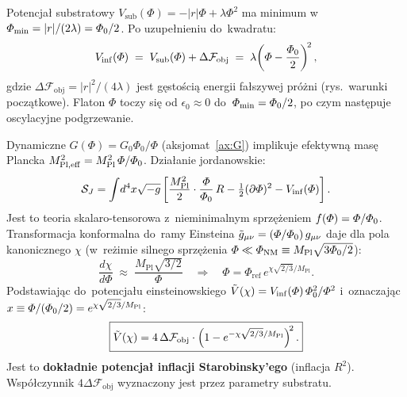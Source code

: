 Potencja\l{} substratowy $V_\mathrm{sub}(\Phi) = -|r|\Phi + \lambda\Phi^2$
ma minimum w~$\varPhi_\mathrm{min} = |r|/(2\lambda) = \varPhi_0/2$.
Po uzupe\l{}nieniu do~kwadratu:
\begin{equation}\label{eq:Vinf-quadratic}
    V_\mathrm{inf}(\varPhi)
    \;=\; V_\mathrm{sub}(\varPhi) + \Delta\mathcal{F}_\mathrm{obj}
    \;=\; \lambda\!\left(\varPhi - \frac{\varPhi_0}{2}\right)^{\!2},
\end{equation}
gdzie $\Delta\mathcal{F}_\mathrm{obj} = |r|^2/(4\lambda)$ jest g\k{e}sto\'sci\k{a}
energii fa\l{}szywej pr\'o\.zni (rys.~warunki pocz\k{a}tkowe).
Flaton $\Phi$ toczy si\k{e} od $\epsilon_0 \approx 0$ do~$\varPhi_\mathrm{min} = \varPhi_0/2$,
po czym nast\k{e}puje oscylacyjne podgrzewanie.

Dynamiczne $G(\Phi) = G_0\Phi_0/\Phi$ (aksjomat~\ref{ax:G}) implikuje
efektywn\k{a} mas\k{e} Plancka $M_\mathrm{Pl,eff}^2 = M_\mathrm{Pl}^2\,\varPhi/\varPhi_0$.
Dzia\l{}anie jordanowskie:
\begin{equation}\label{eq:action-jordan}
    \mathcal{S}_J = \int\!d^4x\sqrt{-g}
    \left[\frac{M_\mathrm{Pl}^2}{2}\cdot\frac{\varPhi}{\varPhi_0}\,R
          - \tfrac{1}{2}(\partial\varPhi)^2 - V_\mathrm{inf}(\varPhi)\right].
\end{equation}
Jest to teoria skalaro-tensorowa z~nieminimalnym sprz\k{e}\.zeniem
$f(\varPhi) = \varPhi/\varPhi_0$. Transformacja konformalna do~ramy Einsteina
$\tilde{g}_{\mu\nu} = (\varPhi/\varPhi_0)\,g_{\mu\nu}$ daje dla pola
kanonicznego $\chi$ (w~re\.zimie silnego sprz\k{e}\.zenia
$\varPhi \ll \varPhi_\mathrm{NM} \equiv M_\mathrm{Pl}\sqrt{3\varPhi_0/2}$):
\begin{equation}\label{eq:chi-of-Phi}
    \frac{d\chi}{d\Phi} \;\approx\; \frac{M_\mathrm{Pl}\sqrt{3/2}}{\Phi}
    \quad\Rightarrow\quad
    \Phi = \Phi_\mathrm{ref}\,e^{\chi\sqrt{2/3}/M_\mathrm{Pl}}.
\end{equation}
Podstawiaj\k{a}c do~potencja\l{}u einsteinowskiego
$\tilde{V}(\chi) = V_\mathrm{inf}(\varPhi)\,\varPhi_0^2/\varPhi^2$ i~oznaczaj\k{a}c
$x \equiv \varPhi/(\varPhi_0/2) = e^{\chi\sqrt{2/3}/M_\mathrm{Pl}}$:
\begin{equation}\label{eq:Vtilde-Starobinsky}
    \boxed{%
    \tilde{V}(\chi)
    = 4\,\Delta\mathcal{F}_\mathrm{obj}\cdot
      \left(1 - e^{-\chi\sqrt{2/3}/M_\mathrm{Pl}}\right)^{\!2}.}
\end{equation}
Jest to \textbf{dok\l{}adnie potencja\l{} inflacji Starobinsky'ego}
(inflacja $R^2$). Wsp\'o\l{}czynnik $4\Delta\mathcal{F}_\mathrm{obj}$
wyznaczony jest przez parametry substratu.

